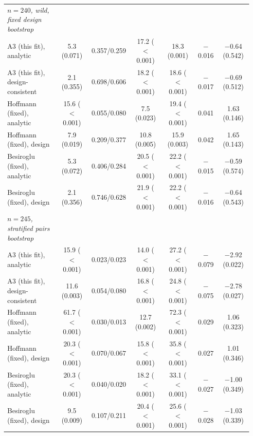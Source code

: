 \begin{table}[!htbp]
\begin{threeparttable}
\begin{tabular}{lcccccc}
\textit{$n=240$, wild, fixed design bootstrap} &  &  &  &  &  &  \\
\quad A3 (this fit), analytic & 5.3 (0.071) & 0.357/0.259 & 17.2 ($<$0.001) & 18.3 (0.001) & $-$0.016 & $-$0.64 (0.542) \\
\quad A3 (this fit), design-consistent & 2.1 (0.355) & 0.698/0.606 & 18.2 ($<$0.001) & 18.6 ($<$0.001) & $-$0.017 & $-$0.69 (0.512) \\
\quad Hoffmann (fixed), analytic & 15.6 ($<$0.001) & 0.055/0.080 & 7.5 (0.023) & 19.4 ($<$0.001) & 0.041 & 1.63 (0.146) \\
\quad Hoffmann (fixed), design & 7.9 (0.019) & 0.209/0.377 & 10.8 (0.005) & 15.9 (0.003) & 0.042 & 1.65 (0.143) \\
\quad Besiroglu (fixed), analytic & 5.3 (0.072) & 0.406/0.284 & 20.5 ($<$0.001) & 22.2 ($<$0.001) & $-$0.015 & $-$0.59 (0.574) \\
\quad Besiroglu (fixed), design & 2.1 (0.356) & 0.746/0.628 & 21.9 ($<$0.001) & 22.2 ($<$0.001) & $-$0.016 & $-$0.64 (0.543) \\
\textit{$n=245$, stratified pairs bootstrap} &  &  &  &  &  &  \\
\quad A3 (this fit), analytic & 15.9 ($<$0.001) & 0.023/0.023 & 14.0 ($<$0.001) & 27.2 ($<$0.001) & $-$0.079 & $-$2.92 (0.022) \\
\quad A3 (this fit), design-consistent & 11.6 (0.003) & 0.054/0.080 & 16.8 ($<$0.001) & 24.8 ($<$0.001) & $-$0.075 & $-$2.78 (0.027) \\
\quad Hoffmann (fixed), analytic & 61.7 ($<$0.001) & 0.030/0.013 & 12.7 (0.002) & 72.3 ($<$0.001) & 0.029 & 1.06 (0.323) \\
\quad Hoffmann (fixed), design & 20.3 ($<$0.001) & 0.070/0.067 & 15.8 ($<$0.001) & 35.8 ($<$0.001) & 0.027 & 1.01 (0.346) \\
\quad Besiroglu (fixed), analytic & 20.3 ($<$0.001) & 0.040/0.020 & 18.2 ($<$0.001) & 33.1 ($<$0.001) & $-$0.027 & $-$1.00 (0.349) \\
\quad Besiroglu (fixed), design & 9.5 (0.009) & 0.107/0.211 & 20.4 ($<$0.001) & 25.6 ($<$0.001) & $-$0.028 & $-$1.03 (0.339) \\
\bottomrule
\end{tabular}
\begin{tablenotes}[flushleft]
\footnotesize

\end{tablenotes}
\end{threeparttable}
\end{table}
